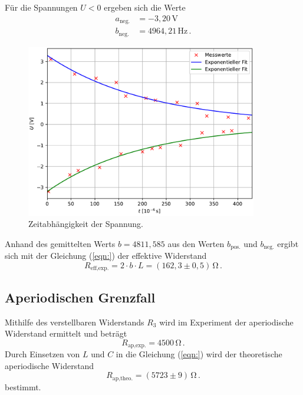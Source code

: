Für die Spannungen $U < 0$ ergeben sich die Werte
\begin{align*}
  a_{\text{neg.}} &= -3,20\,\unit{\volt}\\
  b_{\text{neg.}} &= 4964,21\,\unit{\hertz}\,.
\end{align*}
\begin{figure}[H]
  \centering
  \includegraphics[width=0.90\textwidth]{plot_a.pdf}
  \caption{Zeitabhängigkeit der Spannung.}
  \label{fig:gedämpfteSchwingung}
\end{figure}
Anhand des gemittelten Werts $b = 4811,585$ aus den Werten $b_{\text{pos.}}$ und $b_{\text{neg.}}$ ergibt sich mit der Gleichung (\ref{eqn:})
der effektive Widerstand 
$$R_{\text{eff,exp.}} = 2\cdot b\cdot L = \left(162,3\pm0,5\right)\,\unit{\ohm}\,.$$
%
%
%
\subsection{Aperiodischen Grenzfall}
Mithilfe des verstellbaren Widerstands $R_3$ wird im Experiment der aperiodische Widerstand ermittelt und beträgt
$$R_{\text{ap,exp.}} = 4500\,\unit{\ohm}\,.$$
Durch Einsetzen von $L$ und $C$ in die Gleichung (\ref{eqn:}) wird der theoretische aperiodische Widerstand
$$R_{\text{ap,theo.}} = (5723\pm9)\,\unit{\ohm}\,.$$ bestimmt.
%
%
%
